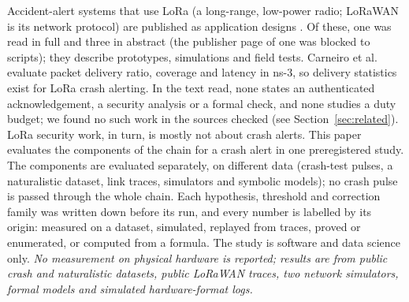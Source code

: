 \documentclass{ieeeaccess}
\begin{document}
Accident-alert systems that use LoRa (a long-range, low-power radio; LoRaWAN is its network protocol) are published as application designs \cite{Vinodhini2025_dac5692,M2025_ijacsa20,Carneiro2023,Marciano2024_me}. Of these, one was read in full and three in abstract (the publisher page of one was blocked to scripts); they describe prototypes, simulations and field tests. Carneiro et al. evaluate packet delivery ratio, coverage and latency in ns-3, so delivery statistics exist for LoRa crash alerting. In the text read, none states an authenticated acknowledgement, a security analysis or a formal check, and none studies a duty budget; we found no such work in the sources checked (see Section~\ref{sec:related}). LoRa security work, in turn, is mostly not about crash alerts. This paper evaluates the components of the chain for a crash alert in one preregistered study. The components are evaluated separately, on different data (crash-test pulses, a naturalistic dataset, link traces, simulators and symbolic models); no crash pulse is passed through the whole chain. Each hypothesis, threshold and correction family was written down before its run, and every number is labelled by its origin: measured on a dataset, simulated, replayed from traces, proved or enumerated, or computed from a formula. The study is software and data science only. \emph{No measurement on physical hardware is reported; results are from public crash and naturalistic datasets, public LoRaWAN traces, two network simulators, formal models and simulated hardware-format logs.}
\end{document}
